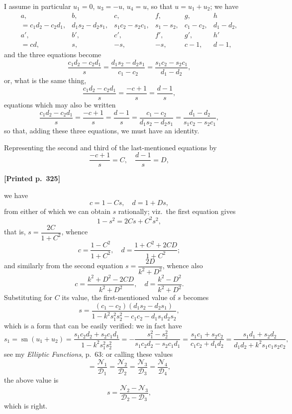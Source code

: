 \documentclass[11pt]{article}
\begin{document}
I assume in particular $u_{1} = 0$, $u_{3} = -u$, $u_{4} = u$, so that $u = u_{1} + u_{2}$; we have
\[
\begin{array}{cccccc}
a, & b, & c, & f, & g, & h \\
= c_{1}d_{2} - c_{2}d_{1}, & d_{1}s_{2} - d_{2}s_{1}, & s_{1}c_{2} - s_{2}c_{1}, & s_{1} - s_{2}, & c_{1} - c_{2}, & d_{1} - d_{2}, \\[2pt]
a', & b', & c', & f', & g', & h' \\
= cd, & s, & -s, & -s, & c-1, & d-1,
\end{array}
\]
and the three equations become
\[
\frac{c_{1}d_{2} - c_{2}d_{1}}{s} = \frac{d_{1}s_{2} - d_{2}s_{1}}{c_{1} - c_{2}} = \frac{s_{1}c_{2} - s_{2}c_{1}}{d_{1} - d_{2}},
\]
or, what is the same thing,
\[
\frac{c_{1}d_{2} - c_{2}d_{1}}{s} = \frac{-c+1}{s} = \frac{d-1}{s},
\]
equations which may also be written
\[
\frac{c_{1}d_{2} - c_{2}d_{1}}{s} = \frac{-c+1}{s} = \frac{d-1}{s} = \frac{c_{1} - c_{2}}{d_{1}s_{2} - d_{2}s_{1}} = \frac{d_{1} - d_{2}}{s_{1}c_{2} - s_{2}c_{1}},
\]
so that, adding these three equations, we must have an identity.

\medskip

Representing the second and third of the last-mentioned equations by
\[
\frac{-c + 1}{s} = C, \quad \frac{d - 1}{s} = D,
\]

\medskip

\noindent\textbf{[Printed p.~325]}\hfill

we have
\[
c = 1 - Cs, \quad d = 1 + Ds,
\]
from either of which we can obtain $s$ rationally; viz.\ the first equation gives
\[
1 - s^{2} = 2Cs + C^{2}s^{2},
\]
that is, $s = \dfrac{2C}{1 + C^{2}}$, whence
\[
c = \frac{1 - C^{2}}{1 + C^{2}}, \quad d = \frac{1 + C^{2} + 2CD}{1 + C^{2}};
\]
and similarly from the second equation $s = \dfrac{2D}{k^{2} + D^{2}}$, whence also
\[
c = \frac{k^{2} + D^{2} - 2CD}{k^{2} + D^{2}}, \quad d = \frac{k^{2} - D^{2}}{k^{2} + D^{2}}.
\]
Substituting for $C$ its value, the first-mentioned value of $s$ becomes
\[
s = \frac{(c_{1} - c_{2})(d_{1}s_{2} - d_{2}s_{1})}{1 - k^{2}s_{1}^{2}s_{2}^{2} - c_{1}c_{2} - d_{1}s_{1}d_{2}s_{2}},
\]
which is a form that can be easily verified: we in fact have
\[
s_{1} = \operatorname{sn}(u_{1} + u_{2}) = \frac{s_{1}c_{2}d_{2} + s_{2}c_{1}d_{1}}{1 - k^{2}s_{1}^{2}s_{2}^{2}} = -\frac{s_{1}^{2} - s_{2}^{2}}{s_{1}c_{2}d_{2} - s_{2}c_{1}d_{1}} = \frac{s_{1}c_{1} + s_{2}c_{2}}{c_{1}c_{2} + d_{1}d_{2}} = \frac{s_{1}d_{1} + s_{2}d_{2}}{d_{1}d_{2} + k^{2}s_{1}c_{1}s_{2}c_{2}},
\]
see my \textit{Elliptic Functions}, p.\ 63: or calling these values
\[
= \frac{\mathcal{N}_{1}}{\mathcal{D}_{1}} = \frac{\mathcal{N}_{2}}{\mathcal{D}_{2}} = \frac{\mathcal{N}_{3}}{\mathcal{D}_{3}} = \frac{\mathcal{N}_{4}}{\mathcal{D}_{4}},
\]
the above value is
\[
s = \frac{\mathcal{N}_{2} - \mathcal{N}_{3}}{\mathcal{D}_{2} - \mathcal{D}_{3}},
\]
which is right.
\end{document}
